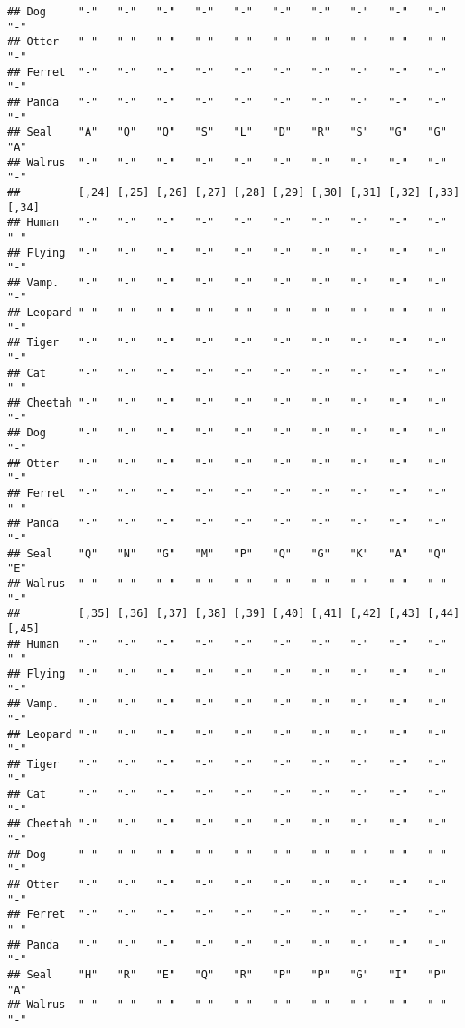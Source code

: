 \documentclass[]{article}
\begin{document}
\begin{verbatim}
## Dog     "-"   "-"   "-"   "-"   "-"   "-"   "-"   "-"   "-"   "-"   "-"  
## Otter   "-"   "-"   "-"   "-"   "-"   "-"   "-"   "-"   "-"   "-"   "-"  
## Ferret  "-"   "-"   "-"   "-"   "-"   "-"   "-"   "-"   "-"   "-"   "-"  
## Panda   "-"   "-"   "-"   "-"   "-"   "-"   "-"   "-"   "-"   "-"   "-"  
## Seal    "A"   "Q"   "Q"   "S"   "L"   "D"   "R"   "S"   "G"   "G"   "A"  
## Walrus  "-"   "-"   "-"   "-"   "-"   "-"   "-"   "-"   "-"   "-"   "-"  
##         [,24] [,25] [,26] [,27] [,28] [,29] [,30] [,31] [,32] [,33] [,34]
## Human   "-"   "-"   "-"   "-"   "-"   "-"   "-"   "-"   "-"   "-"   "-"  
## Flying  "-"   "-"   "-"   "-"   "-"   "-"   "-"   "-"   "-"   "-"   "-"  
## Vamp.   "-"   "-"   "-"   "-"   "-"   "-"   "-"   "-"   "-"   "-"   "-"  
## Leopard "-"   "-"   "-"   "-"   "-"   "-"   "-"   "-"   "-"   "-"   "-"  
## Tiger   "-"   "-"   "-"   "-"   "-"   "-"   "-"   "-"   "-"   "-"   "-"  
## Cat     "-"   "-"   "-"   "-"   "-"   "-"   "-"   "-"   "-"   "-"   "-"  
## Cheetah "-"   "-"   "-"   "-"   "-"   "-"   "-"   "-"   "-"   "-"   "-"  
## Dog     "-"   "-"   "-"   "-"   "-"   "-"   "-"   "-"   "-"   "-"   "-"  
## Otter   "-"   "-"   "-"   "-"   "-"   "-"   "-"   "-"   "-"   "-"   "-"  
## Ferret  "-"   "-"   "-"   "-"   "-"   "-"   "-"   "-"   "-"   "-"   "-"  
## Panda   "-"   "-"   "-"   "-"   "-"   "-"   "-"   "-"   "-"   "-"   "-"  
## Seal    "Q"   "N"   "G"   "M"   "P"   "Q"   "G"   "K"   "A"   "Q"   "E"  
## Walrus  "-"   "-"   "-"   "-"   "-"   "-"   "-"   "-"   "-"   "-"   "-"  
##         [,35] [,36] [,37] [,38] [,39] [,40] [,41] [,42] [,43] [,44] [,45]
## Human   "-"   "-"   "-"   "-"   "-"   "-"   "-"   "-"   "-"   "-"   "-"  
## Flying  "-"   "-"   "-"   "-"   "-"   "-"   "-"   "-"   "-"   "-"   "-"  
## Vamp.   "-"   "-"   "-"   "-"   "-"   "-"   "-"   "-"   "-"   "-"   "-"  
## Leopard "-"   "-"   "-"   "-"   "-"   "-"   "-"   "-"   "-"   "-"   "-"  
## Tiger   "-"   "-"   "-"   "-"   "-"   "-"   "-"   "-"   "-"   "-"   "-"  
## Cat     "-"   "-"   "-"   "-"   "-"   "-"   "-"   "-"   "-"   "-"   "-"  
## Cheetah "-"   "-"   "-"   "-"   "-"   "-"   "-"   "-"   "-"   "-"   "-"  
## Dog     "-"   "-"   "-"   "-"   "-"   "-"   "-"   "-"   "-"   "-"   "-"  
## Otter   "-"   "-"   "-"   "-"   "-"   "-"   "-"   "-"   "-"   "-"   "-"  
## Ferret  "-"   "-"   "-"   "-"   "-"   "-"   "-"   "-"   "-"   "-"   "-"  
## Panda   "-"   "-"   "-"   "-"   "-"   "-"   "-"   "-"   "-"   "-"   "-"  
## Seal    "H"   "R"   "E"   "Q"   "R"   "P"   "P"   "G"   "I"   "P"   "A"  
## Walrus  "-"   "-"   "-"   "-"   "-"   "-"   "-"   "-"   "-"   "-"   "-"  

\end{verbatim}
\end{document}
